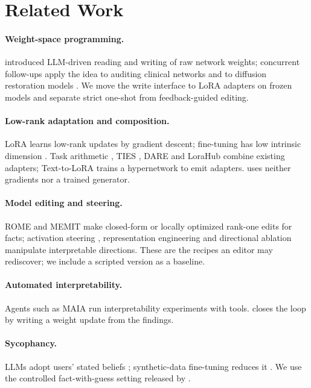 \section{Related Work}
\label{sec:related}

\paragraph{Weight-space programming.} \citet{takehi2026wsp} introduced LLM-driven reading and writing of raw network
weights; concurrent follow-ups apply the idea to auditing clinical networks \citep{nusrat2026wsp} and to diffusion
restoration models \citep{zheng2026wsp}. We move the write interface to LoRA adapters on frozen models and separate
strict one-shot from feedback-guided editing. 

\paragraph{Low-rank adaptation and composition.} LoRA \citep{hu2022lora} learns low-rank updates by gradient descent;
fine-tuning has low intrinsic dimension \citep{aghajanyan2021intrinsic}. Task arithmetic \citep{ilharco2023task},
TIES \citep{yadav2023ties}, DARE \citep{yu2024dare} and LoraHub \citep{huang2023lorahub} combine existing adapters;
Text-to-LoRA \citep{charakorn2025t2l} trains a hypernetwork to emit adapters. \lso{} uses neither gradients nor a
trained generator.

\paragraph{Model editing and steering.} ROME and MEMIT \citep{meng2022rome,meng2023memit} make closed-form or locally
optimized rank-one edits for facts; activation steering \citep{turner2023actadd}, representation engineering
\citep{zou2023repe} and directional ablation \citep{arditi2024refusal} manipulate interpretable directions. These are
the recipes an editor may rediscover; we include a scripted version as a baseline.

\paragraph{Automated interpretability.} Agents such as MAIA \citep{shaham2024maia} run interpretability experiments
with tools. \lso{} closes the loop by writing a weight update from the findings.

\paragraph{Sycophancy.} LLMs adopt users' stated beliefs \citep{sharma2024sycophancy}; synthetic-data fine-tuning
reduces it \citep{wei2023synthetic}. We use the controlled fact-with-guess setting released by \citet{takehi2026logs}.
